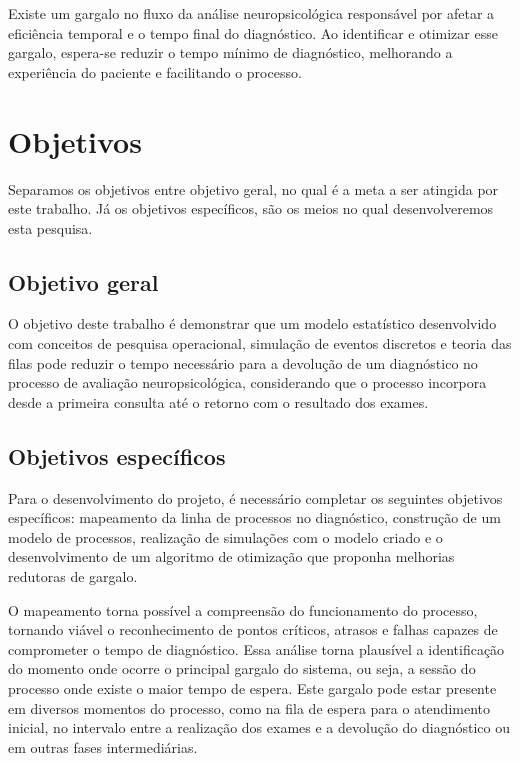 \documentclass[
    12pt,                %
    openright,           %
    oneside,             %
    a4paper,             %
    english,             %
    brazil               %
]{abntex2}
\begin{document}
Existe um gargalo no fluxo da análise neuropsicológica responsável por afetar a eficiência temporal e o tempo final do diagnóstico. Ao identificar e otimizar esse gargalo, espera-se reduzir o tempo mínimo de diagnóstico, melhorando a experiência do paciente e facilitando o processo.

\section{Objetivos}

Separamos os objetivos entre objetivo geral, no qual é a meta a ser atingida por este trabalho. Já os objetivos específicos, são os meios no qual desenvolveremos esta pesquisa.

\subsection{Objetivo geral}

O objetivo deste trabalho é demonstrar que um modelo estatístico desenvolvido com conceitos de pesquisa operacional, simulação de eventos discretos e teoria das filas pode reduzir o tempo necessário para a devolução de um diagnóstico no processo de avaliação neuropsicológica, considerando que o processo incorpora desde a primeira consulta até o retorno com o resultado dos exames.

\subsection{Objetivos específicos}

Para o desenvolvimento do projeto, é necessário completar os seguintes objetivos específicos: mapeamento da linha de processos no diagnóstico, construção de um modelo de processos, realização de simulações com o modelo criado e o desenvolvimento de um algoritmo de otimização que proponha melhorias redutoras de gargalo. 

O mapeamento torna possível a compreensão do funcionamento do processo, tornando viável o reconhecimento de pontos críticos, atrasos e falhas capazes de comprometer o tempo de diagnóstico. Essa análise torna plausível a identificação do momento onde ocorre o principal gargalo do sistema, ou seja, a sessão do processo onde existe o maior tempo de espera. Este gargalo pode estar presente em diversos momentos do processo, como na fila de espera para o atendimento inicial, no intervalo entre a realização dos exames e a devolução do diagnóstico ou em outras fases intermediárias. 
\end{document}
